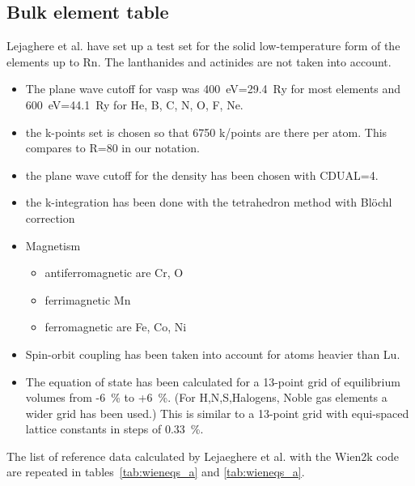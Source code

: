 \documentclass[11pt,a4paper]{report}
\begin{document}
\subsection{Bulk element table}
Lejaghere et al.\cite{lejaeghere14_critrevsolstmatsci39_1} have set up
a test set for the solid low-temperature form of the elements up to
Rn. The lanthanides and actinides are not taken into account.

\begin{itemize}
\item The plane wave cutoff for vasp was 400~eV=29.4~Ry for most
elements and 600~eV=44.1~Ry for He, B, C, N, O, F, Ne.
\item the k-points set is chosen so that 6750 k/points are there per atom.
This compares to R=80 in our notation.
\item the plane wave cutoff for the density has been chosen with
  CDUAL=4.
\item the k-integration has been done with the tetrahedron method with
  Bl\"ochl correction
\item Magnetism
\begin{itemize}
\item antiferromagnetic are Cr, O
\item ferrimagnetic Mn
\item ferromagnetic are Fe, Co, Ni
\end{itemize}
\item Spin-orbit coupling has been taken into account for atoms
  heavier than Lu.
\item The equation of state has been calculated for a 13-point grid of
  equilibrium volumes from -6~\% to +6~\%. (For H,N,S,Halogens, Noble
  gas elements a wider grid has been used.)  This is similar to a
  13-point grid with equi-spaced lattice constants in steps of
  0.33~\%.
\end{itemize}

The list of reference data calculated by Lejaeghere et
al.\cite{lejaeghere14_critrevsolstmatsci39_1} with the Wien2k code are
repeated in tables~\ref{tab:wieneqs_a} and \ref{tab:wieneqs_a}.
\end{document}
